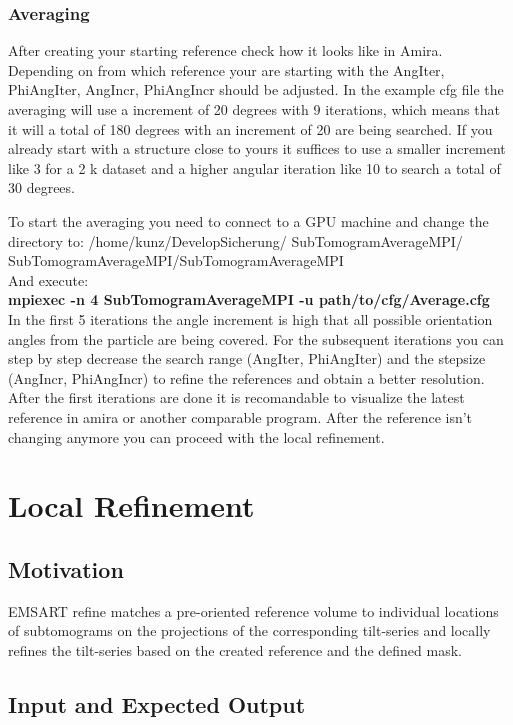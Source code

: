 \documentclass[12pt,a4paper]{scrartcl}
\begin{document}
{\subsubsection{Averaging}
After creating your starting reference check how it looks like in Amira. Depending on from which reference your are starting with the AngIter, PhiAngIter, AngIncr, PhiAngIncr should be adjusted. In the example cfg file the averaging will use a increment of 20 degrees with 9 iterations, which means that it will a total of 180 degrees with an increment of 20 are being searched. If you already start with a structure close to yours it suffices to use a smaller increment like 3 for a 2 k dataset and a higher angular iteration like 10 to search a total of 30 degrees.   

To start the averaging you need to connect to a GPU machine and change the directory to:
/home/kunz/DevelopSicherung/							SubTomogramAverageMPI/ SubTomogramAverageMPI/SubTomogramAverageMPI \\

And execute:\\ 

\textbf{mpiexec -n 4 SubTomogramAverageMPI -u path/to/cfg/Average.cfg}\\

In the first 5 iterations the angle increment is high that all possible orientation angles from the particle are being covered. For the subsequent iterations you can step by step decrease the search range (AngIter, PhiAngIter) and the stepsize (AngIncr, PhiAngIncr) to refine the references and obtain a better resolution. After the first iterations are done it is recomandable to visualize the latest reference in amira or another comparable program. After the reference isn’t changing anymore you can proceed with the local refinement. 



\section{Local Refinement}
\subsection{Motivation}
EMSART refine matches a pre-oriented reference volume to individual locations of subtomograms on the projections of the corresponding tilt-series and locally refines the tilt-series based on the created reference and the defined mask. 
 
\subsection{Input and Expected Output}

}
\end{document}
